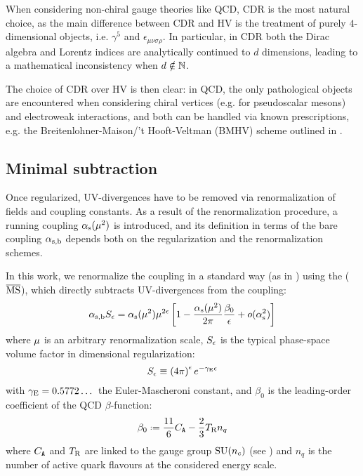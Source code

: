 When considering non-chiral gauge theories like QCD, CDR is the most natural choice, as the main difference between CDR and HV is the treatment of purely $ 4 $-dimensional objects, i.e. $ \gamma^5 $ and $ \epsilon_{\mu \nu \sigma \rho} $. In particular, in CDR both the Dirac algebra and Lorentz indices are analytically continued to $ d $ dimensions, leading to a mathematical inconsistency when $ d \notin \mathbb{N} $.

The choice of CDR over HV is then clear: in QCD, the only pathological objects are encountered when considering chiral vertices (e.g. for pseudoscalar mesons) and electroweak interactions, and both can be handled via known prescriptions, e.g. the Breitenlohner-Maison/'t Hooft-Veltman (BMHV) scheme outlined in \cite{Breitenlohner-1977}.

\subsection{Minimal subtraction}

Once regularized, UV-divergences have to be removed via renormalization of fields and coupling constants. As a result of the renormalization procedure, a running coupling $ \alpha_\text{s}(\mu^2) $ is introduced, and its definition in terms of the bare coupling $ \alpha_\text{s,b} $ depends both on the regularization and the renormalization schemes.

In this work, we renormalize the coupling in a standard way (as in \cite{Catani-1998}) using the  ($ \overline{\text{MS}} $), which directly subtracts UV-divergences from the coupling:
\begin{equation}
  \alpha_\text{s,b} S_\epsilon = \alpha_\text{s}(\mu^2) \mu^{2\epsilon} \left[ 1 - \frac{\alpha_\text{s}(\mu^2)}{2\pi} \frac{\beta_0}{\epsilon} + o(\alpha_\text{s}^2) \right]
  \label{eq:msb-def}
\end{equation}
where $ \mu $ is an arbitrary renormalization scale, $ S_\epsilon $ is the typical phase-space volume factor in dimensional regularization:
\begin{equation}
  S_\epsilon \equiv \left( 4\pi \right)^\epsilon e^{-\gamma_\text{E} \epsilon}
\end{equation}
with $ \gamma_\text{E} = 0.5772\dots $ the Euler-Mascheroni constant, and $ \beta_0 $ is the leading-order coefficient of the QCD $ \beta $-function:
\begin{equation}
  \beta_0 \defeq \frac{11}{6} \caa - \frac{2}{3} \ttr n_q
\end{equation}
where $ C_\mathtt{A} $ and $ T_\text{R} $ are linked to the gauge group $ \mathrm{SU}(n_c) $ (see )  and $ n_q $ is the number of active quark flavours at the considered energy scale\footnotemark.

